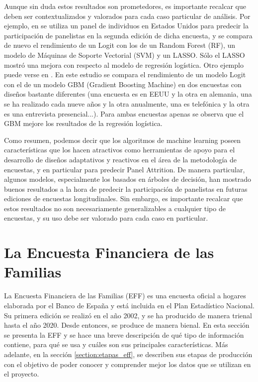 Aunque sin duda estos resultados son prometedores, es importante recalcar que deben ser contextualizados y valorados para cada caso particular de análisis. Por ejemplo, en \cite{liu2020using} se utiliza un panel de individuos en Estados Unidos para predecir la participación de panelistas en la segunda edición de dicha encuesta, y se compara de nuevo el rendimiento de un Logit con los de un Random Forest (RF), un modelo de Máquinas de Soporte Vectorial (SVM) y un LASSO. Sólo el LASSO mostró una mejora con respecto al modelo de regresión logística. Otro ejemplo puede verse en \cite{jankowsky2022validation}. En este estudio se compara el rendimiento de un modelo Logit con el de un modelo GBM (Gradient Boosting Machine) en dos encuestas con diseños bastante diferentes (una encuesta es en EEUU y la otra en alemania, una se ha realizado cada nueve años y la otra anualmente, una es telefónica y la otra es una entrevista presencial...). Para ambas encuestas apenas se observa que el GBM mejore los resultados de la regresión logística.

Como resumen, podemos decir que los algoritmos de machine learning poseen características que los hacen atractivos como herramientas de apoyo para el desarrollo de diseños adaptativos y reactivos en el área de la metodología de encuestas, y en particular para predecir Panel Attrition. De manera particular, algunos modelos, especialmente los basados en árboles de decisión, han mostrado buenos resultados a la hora de predecir la participación de panelistas en futuras ediciones de encuestas longitudinales. Sin embargo, es importante recalcar que estos resultados no son necesariamente generalizables a cualquier tipo de encuestas, y su uso debe ser valorado para cada caso en particular.

\section{La Encuesta Financiera de las Familias}
\label{section:eff}

La Encuesta Financiera de las Familias (EFF) es una encuesta oficial a hogares elaborada por el Banco de España y está incluida en el Plan Estadístico Nacional. Su primera edición se realizó en el año 2002, y se ha producido de manera trienal hasta el año 2020. Desde entonces, se produce de manera bienal. En esta sección se presenta la EFF y se hace una breve descripción de qué tipo de información contiene, para qué se usa y cuáles son sus principales características. Más adelante, en la sección \ref{section:etapas_eff}, se describen sus etapas de producción con el objetivo de poder conocer y comprender mejor los datos que se utilizan en el proyecto.

